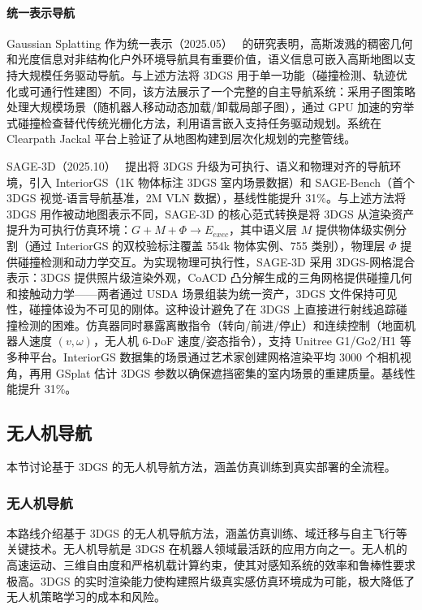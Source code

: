\paragraph{统一表示导航}

Gaussian Splatting 作为统一表示（2025.05）~\cite{2505_11794} 的研究表明，高斯泼溅的稠密几何和光度信息对非结构化户外环境导航具有重要价值，语义信息可嵌入高斯地图以支持大规模任务驱动导航。与上述方法将 3DGS 用于单一功能（碰撞检测、轨迹优化或可通行性建图）不同，该方法展示了一个完整的自主导航系统：采用子图策略处理大规模场景（随机器人移动动态加载/卸载局部子图），通过 GPU 加速的穷举式碰撞检查替代传统光栅化方法，利用语言嵌入支持任务驱动规划。系统在 Clearpath Jackal 平台上验证了从地图构建到层次化规划的完整管线。

SAGE-3D（2025.10）~\cite{2510_21307} 提出将 3DGS 升级为可执行、语义和物理对齐的导航环境，引入 InteriorGS（1K 物体标注 3DGS 室内场景数据）和 SAGE-Bench（首个 3DGS 视觉-语言导航基准，2M VLN 数据），基线性能提升 31\%。与上述方法将 3DGS 用作被动地图表示不同，SAGE-3D 的核心范式转换是将 3DGS 从渲染资产提升为可执行仿真环境：$G + M + \Phi \rightarrow E_{exec}$，其中语义层 $M$ 提供物体级实例分割（通过 InteriorGS 的双校验标注覆盖 554k 物体实例、755 类别），物理层 $\Phi$ 提供碰撞检测和动力学交互。为实现物理可执行性，SAGE-3D 采用 3DGS-网格混合表示：3DGS 提供照片级渲染外观，CoACD 凸分解生成的三角网格提供碰撞几何和接触动力学——两者通过 USDA 场景组装为统一资产，3DGS 文件保持可见性，碰撞体设为不可见的刚体。这种设计避免了在 3DGS 上直接进行射线追踪碰撞检测的困难。仿真器同时暴露离散指令（转向/前进/停止）和连续控制（地面机器人速度 $(v,\omega)$，无人机 6-DoF 速度/姿态指令），支持 Unitree G1/Go2/H1 等多种平台。InteriorGS 数据集的场景通过艺术家创建网格渲染平均 3000 个相机视角，再用 GSplat 估计 3DGS 参数以确保遮挡密集的室内场景的重建质量。基线性能提升 31\%。

\subsection{无人机导航}
\label{ss:17_1c}

本节讨论基于 3DGS 的无人机导航方法，涵盖仿真训练到真实部署的全流程。

\subsubsection{无人机导航}

本路线介绍基于 3DGS 的无人机导航方法，涵盖仿真训练、域迁移与自主飞行等关键技术。无人机导航是 3DGS 在机器人领域最活跃的应用方向之一。无人机的高速运动、三维自由度和严格机载计算约束，使其对感知系统的效率和鲁棒性要求极高。3DGS 的实时渲染能力使构建照片级真实感仿真环境成为可能，极大降低了无人机策略学习的成本和风险。

